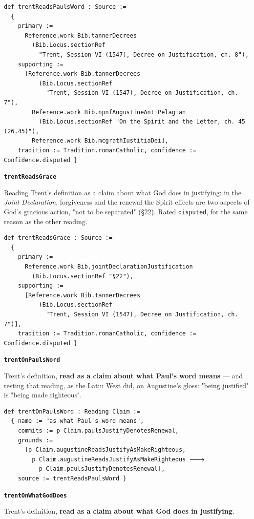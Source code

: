 \documentclass[11pt]{article}
\begin{document}
{\small\begin{verbatim}
def trentReadsPaulsWord : Source :=
  {
    primary :=
      Reference.work Bib.tannerDecrees
        (Bib.Locus.sectionRef
          "Trent, Session VI (1547), Decree on Justification, ch. 8"),
    supporting :=
      [Reference.work Bib.tannerDecrees
          (Bib.Locus.sectionRef
            "Trent, Session VI (1547), Decree on Justification, ch. 7"),
        Reference.work Bib.npnfAugustineAntiPelagian
          (Bib.Locus.sectionRef "On the Spirit and the Letter, ch. 45 (26.45)"),
        Reference.work Bib.mcgrathIustitiaDei],
    tradition := Tradition.romanCatholic, confidence := Confidence.disputed }
\end{verbatim}}
\par\medskip\noindent\textbf{\texttt{trent\allowbreak{}Reads\allowbreak{}Grace}}\par\nobreak\noindent
Reading Trent's definition as a claim about what God does in justifying: in the \emph{Joint Declaration}, forgiveness and the renewal the Spirit effects are two aspects of God's gracious action, "not to be separated" (§22). Rated \texttt{disputed}, for the same reason as the other reading.

{\small\begin{verbatim}
def trentReadsGrace : Source :=
  {
    primary :=
      Reference.work Bib.jointDeclarationJustification
        (Bib.Locus.sectionRef "§22"),
    supporting :=
      [Reference.work Bib.tannerDecrees
          (Bib.Locus.sectionRef
            "Trent, Session VI (1547), Decree on Justification, ch. 7")],
    tradition := Tradition.romanCatholic, confidence := Confidence.disputed }
\end{verbatim}}
\par\medskip\noindent\textbf{\texttt{trent\allowbreak{}On\allowbreak{}Pauls\allowbreak{}Word}}\par\nobreak\noindent
Trent's definition, \textbf{read as a claim about what Paul's word means} — and resting that reading, as the Latin West did, on Augustine's gloss: "being justified" is "being made righteous".

{\small\begin{verbatim}
def trentOnPaulsWord : Reading Claim :=
  { name := "as what Paul's word means",
    commits := p Claim.paulsJustifyDenotesRenewal,
    grounds :=
      [p Claim.augustineReadsJustifyAsMakeRighteous,
        p Claim.augustineReadsJustifyAsMakeRighteous 🡒
          p Claim.paulsJustifyDenotesRenewal],
    source := trentReadsPaulsWord }
\end{verbatim}}
\par\medskip\noindent\textbf{\texttt{trent\allowbreak{}On\allowbreak{}What\allowbreak{}God\allowbreak{}Does}}\par\nobreak\noindent
Trent's definition, \textbf{read as a claim about what God does in justifying}.
\end{document}
